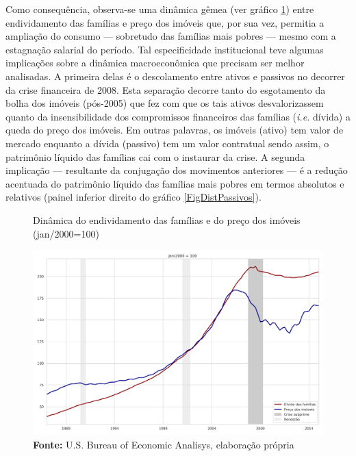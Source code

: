 Como consequência, observa-se uma dinâmica gêmea (ver gráfico \ref{FigDividaPreco}) entre endividamento das famílias e preço dos imóveis que, por sua vez, permitia a ampliação do consumo --- sobretudo das famílias mais pobres --- mesmo com a estagnação salarial do período.
Tal especificidade institucional teve algumas implicações sobre a dinâmica macroeconômica que precisam ser melhor analisadas.
A primeira delas é o descolamento entre ativos e passivos no decorrer da crise financeira de 2008.
Esta separação decorre tanto do esgotamento da bolha dos imóveis (pós-2005) que fez com que os tais ativos desvalorizassem quanto da insensibilidade dos compromissos financeiros das famílias (\textit{i.e.} dívida) a queda do preço dos imóveis.
Em outras palavras, os imóveis (ativo) tem valor de mercado enquanto a dívida (passivo) tem um valor contratual sendo assim, o patrimônio líquido das famílias cai com o instaurar da crise.
A segunda implicação --- resultante da conjugação dos movimentos anteriores --- é a redução acentuada do patrimônio líquido das famílias mais pobres em termos absolutos e relativos (painel inferior direito do gráfico \ref{FigDistPassivos}).


\begin{figure}[H]
	\centering
	\caption{Dinâmica do endividamento das famílias e do preço dos imóveis (jan/2000=100)}
	\label{FigDividaPreco}
	\includegraphics[width=\textwidth]{../../Dados/Fatos_Estilizados/figs/Divida_PrecoImoveis.png}
	\caption*{\textbf{Fonte:} U.S. Bureau of Economic Analisys, elaboração própria}
\end{figure}

